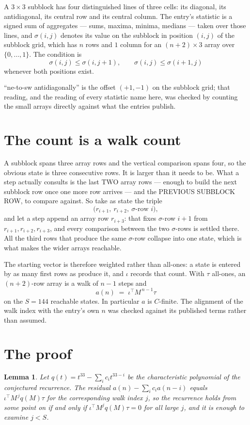 \documentclass[11pt,a4paper]{article}
\theoremstyle{plain}
\newtheorem{lemma}[theorem]{Lemma}
\theoremstyle{definition}
\begin{document}
A $3\times3$ subblock has four distinguished lines of three cells: its diagonal, its
antidiagonal, its central row and its central column. The entry's statistic is a signed sum of
aggregates --- sums, maxima, minima, medians --- taken over those lines, and $\sigma(i,j)$
denotes its value on the subblock in position $(i,j)$ of the subblock grid, which has $n$ rows
and $1$ column for an $(n+2)\times3$ array over $\{0,\dots,1\}$. The condition is
\[
\sigma(i,j)\le\sigma(i,j+1),\qquad \sigma(i,j)\le\sigma(i+1,j)
\]
whenever both positions exist.

``ne-to-sw antidiagonally'' is the offset $(+1,-1)$ on the subblock grid; that reading, and
the reading of every statistic name here, was checked by counting the small arrays directly
against what the entries publish.

\section{The count is a walk count}

A subblock spans three array rows and the vertical comparison spans four, so the obvious state
is three consecutive rows. It is larger than it needs to be. What a step actually consults is
the last TWO array rows --- enough to build the next subblock row once one more row arrives ---
and the PREVIOUS SUBBLOCK ROW, to compare against. So take as state the triple
\[
\bigl(r_{i+1},\ r_{i+2},\ \sigma\text{-row }i\bigr),
\]
and let a step append an array row $r_{i+3}$: that fixes $\sigma$-row $i+1$ from
$r_{i+1},r_{i+2},r_{i+3}$, and every comparison between the two $\sigma$-rows is settled
there. All the third rows that produce the same $\sigma$-row collapse into one state, which is
what makes the wider arrays reachable.

The starting vector is therefore weighted rather than all-ones: a state is entered by as many
first rows as produce it, and $\iota$ records that count. With $\tau$ all-ones, an
$(n+2)$-row array is a walk of $n-1$ steps and
\[
a(n)\;=\;\iota^{\!\top}M^{\,n-1}\tau
\]
on the $S=144$ reachable states. In particular $a$ is $C$-finite. The alignment of the walk
index with the entry's own $n$ was checked against its published terms rather than assumed.

\section{The proof}

\begin{lemma}\label{lem:crit}
Let $q(t)=t^{33}-\sum_i c_it^{33-i}$ be the characteristic polynomial of the
conjectured recurrence. The residual $a(n)-\sum_ic_ia(n-i)$ equals
$\iota^{\!\top}M^{\,j}q(M)\tau$ for the corresponding walk index $j$, so the recurrence
holds from some point on if and only if $\iota^{\!\top}M^{j}q(M)\tau=0$ for all large $j$,
and it is enough to examine $j<S$.
\end{lemma}
\end{document}
